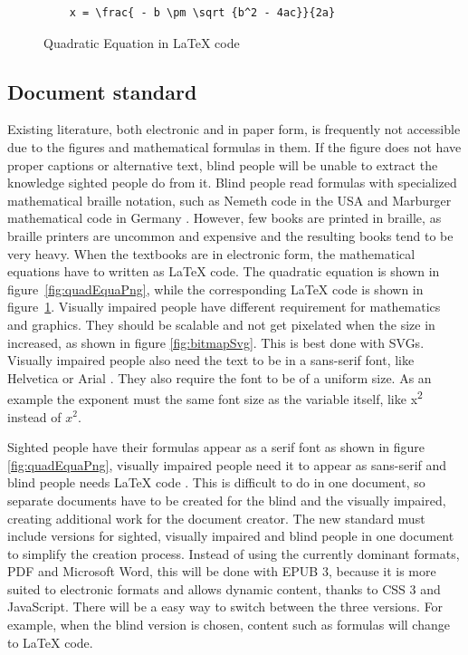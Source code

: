 \begin{figure}
	\begin{lstlisting}
	x = \frac{ - b \pm \sqrt {b^2 - 4ac}}{2a}
	\end{lstlisting}
	\caption{Quadratic Equation in LaTeX code}
	\label{fig:quadEquaLatex}
\end{figure}


\subsection{Document standard}
Existing literature, both electronic and in paper form, is frequently not accessible due to the figures and mathematical formulas in them. If the figure does not have proper captions or alternative text, blind people will be unable to extract the knowledge sighted people do from it. Blind people read formulas with specialized mathematical braille notation, such as Nemeth code in the USA and Marburger mathematical code in Germany \cite{augenbitWiki}. However, few books are printed in braille, as braille printers are uncommon and expensive and the resulting books tend to be very heavy. When the textbooks are in electronic form, the mathematical equations have to written as LaTeX code. The quadratic equation is shown in figure~\ref{fig:quadEquaPng}, while the corresponding LaTeX code is shown in figure~\ref{fig:quadEquaLatex}. Visually impaired people have different requirement for mathematics and graphics. They should be scalable and not get pixelated when the size in increased, as shown in figure \ref{fig:bitmapSvg}. This is best done with SVGs. Visually impaired people also need the text to be in a sans-serif font, like Helvetica or Arial \cite{pdfBarrierefrei}. They also require the font to be of a uniform size. As an example the exponent must the same font size as the variable itself, like x\textsuperscript{{\normalsize{2}}} instead of $x^{2}$. 


Sighted people have their formulas appear as a serif font as shown in figure \ref{fig:quadEquaPng}, visually impaired people need it to appear as sans-serif and blind people needs LaTeX code \cite{augenbitWiki}. This is difficult to do in one document, so separate documents have to be created for the blind and the visually impaired, creating additional work for the document creator. The new standard must include versions for sighted, visually impaired and blind people in one document to simplify the creation process. Instead of using the currently dominant formats, PDF and Microsoft Word, this will be done with EPUB 3, because it is more suited to electronic formats and allows dynamic content, thanks to CSS 3 and JavaScript. There will be a easy way to switch between the three versions. For example, when the blind version is chosen, content such as formulas will change to LaTeX code.

